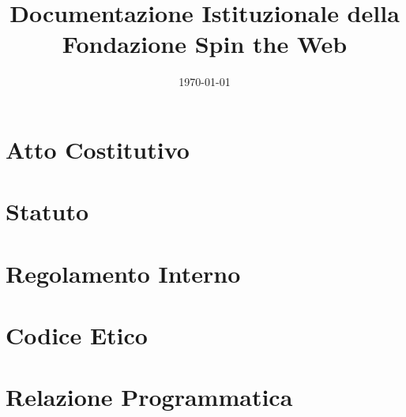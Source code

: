 \documentclass[11pt,a4paper]{article}
\title{Documentazione Istituzionale della Fondazione Spin the Web}
\author{}
\date{\today}
\begin{document}
\maketitle
\tableofcontents

\newpage
\section{Atto Costitutivo}


\newpage
\section{Statuto}


\newpage
\section{Regolamento Interno}


\newpage
\section{Codice Etico}


\newpage
\section{Relazione Programmatica}

\end{document}
